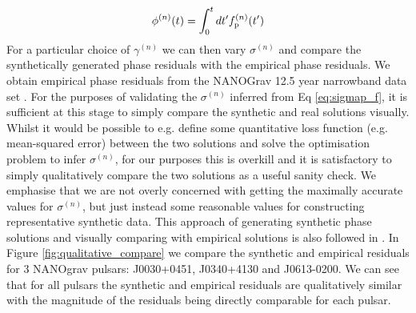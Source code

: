 \documentclass[fleqn,usenatbib,useAMS]{mnras}
\begin{document}
\begin{eqnarray}
	\phi^{(n)}(t) = \int_0^t dt' f^{(n)}_{\rm p}(t') 
\end{eqnarray}
For a particular choice of $\gamma^{(n)}$ we can then vary $\sigma^{(n)}$ and compare the synthetically generated phase residuals with the empirical phase residuals. We obtain empirical phase residuals from the NANOGrav 12.5 year narrowband data set \cite{nanograv_narrowband_DR}. For the purposes of validating the $\sigma^{(n)}$ inferred from Eq \ref{eq:sigmap_f}, it is sufficient at this stage to simply compare the synthetic and real solutions visually. Whilst it would be possible to e.g. define some quantitative loss function (e.g. mean-squared error) between the two solutions and solve the optimisation problem to infer $\sigma^{(n)}$, for our purposes this is overkill and it is satisfactory to simply qualitatively compare the two solutions as a useful sanity check. We emphasise that we are not overly concerned with getting the maximally accurate values for $\sigma^{(n)}$, but just instead some reasonable values for constructing representative synthetic data. This approach of generating synthetic phase solutions and visually comparing with empirical solutions is also followed in \cite{Vargas}. In Figure \ref{fig:qualitative_compare} we compare the synthetic and empirical residuals for 3 NANOgrav pulsars: J0030+0451, J0340+4130 and J0613-0200. We can see that for all pulsars the synthetic and empirical residuals are qualitatively similar with the magnitude of the residuals being directly comparable for each pulsar. 
\end{document}
